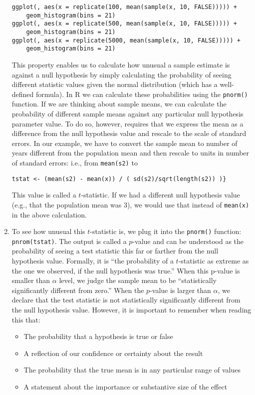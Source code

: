 \documentclass[a4paper,12pt]{article}
\begin{document}
\begin{enumerate}
\begin{verbatim}
ggplot(, aes(x = replicate(100, mean(sample(x, 10, FALSE))))) +
    geom_histogram(bins = 21)
ggplot(, aes(x = replicate(500, mean(sample(x, 10, FALSE))))) +
    geom_histogram(bins = 21)
ggplot(, aes(x = replicate(5000, mean(sample(x, 10, FALSE))))) +
    geom_histogram(bins = 21)
\end{verbatim}

\noindent This property enables us to calculate how unusual a sample estimate is against a null hypothesis by simply calculating the probability of seeing different statistic values given the normal distribution (which has a well-defined formula). In R we can calculate these probabilities using the \texttt{pnorm()} function. If we are thinking about sample means, we can calculate the probability of different sample means against any particular null hypothesis parameter value. To do so, however, requires that we express the mean as a difference from the null hypothesis value and rescale to the scale of standard errors. In our example, we have to convert the sample mean to number of years different from the population mean and then rescale to units in number of standard errors: i.e., from \texttt{mean(s2)} to 

\begin{verbatim}
tstat <- (mean(s2) - mean(x)) / ( sd(s2)/sqrt(length(s2)) )}
\end{verbatim}

\noindent This value is called a $t$-statistic. If we had a different null hypothesis value (e.g., that the population mean was 3), we would use that instead of \texttt{mean(x)} in the above calculation.

\item To see how unusual this $t$-statistic is, we plug it into the \texttt{pnorm()} function: \texttt{pnrom(tstat)}. The output is called a $p$-value and can be understood as the probability of seeing a test statistic this far or farther from the null hypothesis value. Formally, it is ``the probability of a $t$-statistic as extreme as the one we observed, if the null hypothesis was true.'' When this p-value is smaller than $\alpha$ level, we judge the sample mean to be ``statistically significantly different from zero.'' When the $p$-value is larger than $\alpha$, we declare that the test statistic is not statistically significantly different from the null hypothesis value. However, it is important to remember when reading this that:

\begin{itemize}
\item The probability that a hypothesis is true or false
\item A reflection of our confidence or certainty about the result
\item The probability that the true mean is in any particular range of values
\item A statement about the importance or substantive size of the effect
\end{itemize}


\end{enumerate}
\end{document}

